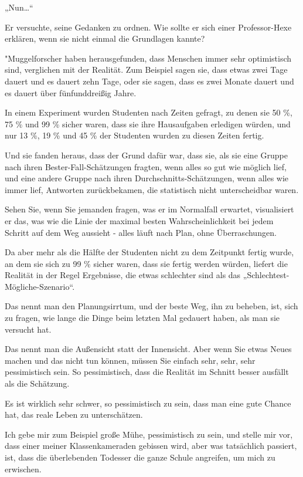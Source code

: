{„Nun…“

Er versuchte, seine Gedanken zu ordnen. Wie sollte er sich einer Professor-Hexe erklären, wenn sie nicht einmal die Grundlagen kannte?

"Muggelforscher haben herausgefunden, dass Menschen immer sehr optimistisch sind, verglichen mit der Realität. Zum Beispiel sagen sie, dass etwas zwei Tage dauert und es dauert zehn Tage, oder sie sagen, dass es zwei Monate dauert und es dauert über fünfunddreißig Jahre.

In einem Experiment wurden Studenten nach Zeiten gefragt, zu denen sie 50 \%, 75 \% und 99 \% sicher waren, dass sie ihre Hausaufgaben erledigen würden, und nur 13 \%, 19 \% und 45 \% der Studenten wurden zu diesen Zeiten fertig.

Und sie fanden heraus, dass der Grund dafür war, dass sie, als sie eine Gruppe nach ihren Bester-Fall-Schätzungen fragten, wenn alles so gut wie möglich lief, und eine andere Gruppe nach ihren Durchschnitts-Schätzungen, wenn alles wie immer lief, Antworten zurückbekamen, die statistisch nicht unterscheidbar waren.

Sehen Sie, wenn Sie jemanden fragen, was er im Normalfall erwartet, visualisiert er das, was wie die Linie der maximal besten Wahrscheinlichkeit bei jedem Schritt auf dem Weg aussieht - alles läuft nach Plan, ohne Überraschungen.

Da aber mehr als die Hälfte der Studenten nicht zu dem Zeitpunkt fertig wurde, an dem sie sich zu 99 \% sicher waren, dass sie fertig werden würden, liefert die Realität in der Regel Ergebnisse, die etwas schlechter sind als das „Schlechtest-Mögliche-Szenario“.

Das nennt man den Planungsirrtum, und der beste Weg, ihn zu beheben, ist, sich zu fragen, wie lange die Dinge beim letzten Mal gedauert haben, als man sie versucht hat.

Das nennt man die Außensicht statt der Innensicht. Aber wenn Sie etwas Neues machen und das nicht tun können, müssen Sie einfach sehr, sehr, sehr pessimistisch sein. So pessimistisch, dass die Realität im Schnitt besser ausfällt als die Schätzung.

Es ist wirklich sehr schwer, so pessimistisch zu sein, dass man eine gute Chance hat, das reale Leben zu unterschätzen.

Ich gebe mir zum Beispiel große Mühe, pessimistisch zu sein, und stelle mir vor, dass einer meiner Klassenkameraden gebissen wird, aber was tatsächlich passiert, ist, dass die überlebenden Todesser die ganze Schule angreifen, um mich zu erwischen.

}
